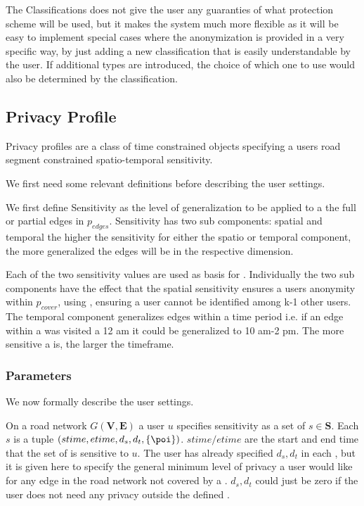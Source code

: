 The Classifications does not give the user any guaranties of what protection scheme will be used, but it makes the system much more flexible as it will be easy to implement special cases where the anonymization is provided in a very specific way, by just adding a new classification that is easily understandable by the user. If additional \poi types are introduced, the choice of which one to use would also be determined by the \poi classification.



\subsection{Privacy Profile}\label{sec:usrprofile}

Privacy profiles are a class of time constrained objects specifying a users road segment constrained
spatio-temporal sensitivity.

We first need some relevant definitions before describing the user settings.

We first define Sensitivity as the level of generalization to be applied to a the full or partial edges in $p_{edges}$. Sensitivity has two sub components: spatial and temporal the higher the sensitivity for either the spatio or temporal component, the more generalized the edges will be in the respective dimension.

Each of the two sensitivity values are used as basis for \tanonns. Individually the two sub components have the effect that the spatial sensitivity ensures a users anonymity within $p_{cover}$, using \kanonns\cite{trajecGeneral09}, ensuring a user cannot be identified among k-1 other users.
The temporal component generalizes edges within a time period i.e. if an edge within a \poi was visited a 12 am it could be generalized to 10 am-2 pm. The more sensitive a \poi is, the larger the timeframe.



\subsubsection{Parameters}
We now formally describe the user settings.

On a road network $G(\mathbf{V,E})$ a user $u$ specifies sensitivity as a set of $s \in \mathbf{S}$. Each $s$ is a tuple $\left(stime,etime,d_s, d_t,\{\poi \} \right)$. $stime/etime$ are the start and end time that the set of \poi is sensitive to $u$. The user has already specified $d_s,d_t$ in each \poins, but it is given  here to specify the general minimum level of privacy a user would like for any edge in the road network not covered by a \poins. $d_s,d_t$ could just be zero if the user does not need any privacy outside the defined \poisns.

